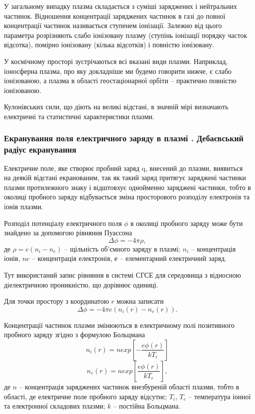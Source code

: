 \documentclass[a4paper,12pt]{article}
\begin{document}
У загальному випадку плазма складається з суміші заряджених і нейтральних частинок. Відношення концентрації заряджених частинок в газі до повної концентрації частинок називається ступенем іонізації. Залежно від цього параметра розрізняють слабо іонізовану плазму (ступінь іонізації порядку часток відсотка), помірно іонізовану (кілька відсотків) і повністю іонізовану.

У космічному просторі зустрічаються всі вказані види плазми. Наприклад, іоносферна плазма, про яку докладніше ми будемо говорити нижче, є слабо іонізованою, а плазма в області геостаціонарної орбіти -- практично повністю іонізованою.

Кулонівських сили, що діють на великі відстані, в значній мірі визначають електричні та статистичні характеристики плазми.\cite{novikov}

\subsubsection{Екранування поля електричного заряду в плазмі
. Дебаєвський радіус екранування}
Електричне поле, яке створює пробний заряд q, внесений до плазми, виявиться на деякій відстані екранованим, так як такий заряд притягує заряджені частинки плазми протилежного знаку і відштовхує однойменно заряджені частинки, тобто в околиці пробного заряду відбувається зміна просторового розподілу електронів та іонів плазми.

Розподіл потенціалу електричного поля $\phi$ в околиці пробного заряду може бути знайдено за допомогою рівняння Пуассона
\[\Delta \phi = -4 \pi \rho,\]
де $\rho = e(n_i - n_e)$ -- щільність об'ємного заряду в плазмі; $n_i$ -- концентрація іонів, $ne$ -- концентрація електронів, $е$ -- елементарний електричний заряд.

Тут використаний запис рівняння в системі СГСЕ для середовища з відносною діелектричною проникністю, що дорівнює одиниці.

Для точки простору з координатою $r$ можна записати
\[\Delta \phi = -4 \pi e (n_i(r) - n_e(r)).\]

Концентрації частинок плазми змінюються в електричному полі позитивного пробного заряду згідно з формулою Больцмана
\[n_i(r) = n exp\left[ - \frac{e\phi(r)}{kT_i} \right]\]
\[n_e(r) = n exp\left[  \frac{e\phi(r)}{kT_e} \right],\]
де $n$ -- концентрація заряджених частинок внезбуреній області плазми, тобто в області, де електричне поле пробного заряду відсутнє; $T_i$, $T_e$ -- температура іонної та електронної складових плазми; $k$ -- постійна Больцмана.
\end{document}
